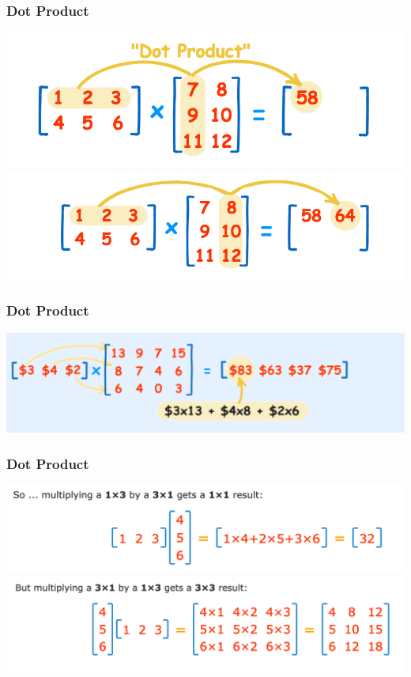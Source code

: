 \documentclass[t, 11pt]{beamer}
\begin{document}
	\begin{frame} 
		\frametitle{\insertsection} 
		\frametitle{Dot Product} 
		\includegraphics[scale=0.6]{funmath1}	
		\includegraphics[scale=0.6]{funmath2}	
	\end{frame}	
	
	\begin{frame} 
		\frametitle{\insertsection} 
		\frametitle{Dot Product} 
		\includegraphics[scale=0.4]{funmath3}	
	\end{frame}	
	
	\begin{frame} 
		\frametitle{\insertsection} 
		\frametitle{Dot Product} 
		\includegraphics[scale=0.5]{funmath4}	
		\includegraphics[scale=0.5]{funmath5}	
	\end{frame}	
	
\end{document}
